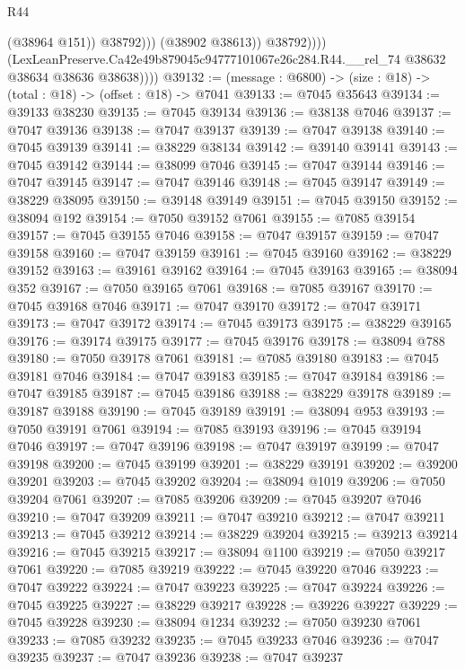 \begin{lexlean}{R44}
\begin{coremodule}
{                            (@38964 @151))
                          @38792)))
                    (@38902 @38613))
                  @38792))))
          (LexLeanPreserve.Ca42e49b879045c94777101067e26c284.R44.__rel_74
            @38632
            @38634
            @38636
            @38638))))
@39132 := (message : @6800) -> (size : @18) -> (total : @18) -> (offset : @18) -> @7041
@39133 := @7045 @35643
@39134 := @39133 @38230
@39135 := @7045 @39134
@39136 := @38138 @7046
@39137 := @7047 @39136
@39138 := @7047 @39137
@39139 := @7047 @39138
@39140 := @7045 @39139
@39141 := @38229 @38134
@39142 := @39140 @39141
@39143 := @7045 @39142
@39144 := @38099 @7046
@39145 := @7047 @39144
@39146 := @7047 @39145
@39147 := @7047 @39146
@39148 := @7045 @39147
@39149 := @38229 @38095
@39150 := @39148 @39149
@39151 := @7045 @39150
@39152 := @38094 @192
@39154 := @7050 @39152 @7061
@39155 := @7085 @39154
@39157 := @7045 @39155 @7046
@39158 := @7047 @39157
@39159 := @7047 @39158
@39160 := @7047 @39159
@39161 := @7045 @39160
@39162 := @38229 @39152
@39163 := @39161 @39162
@39164 := @7045 @39163
@39165 := @38094 @352
@39167 := @7050 @39165 @7061
@39168 := @7085 @39167
@39170 := @7045 @39168 @7046
@39171 := @7047 @39170
@39172 := @7047 @39171
@39173 := @7047 @39172
@39174 := @7045 @39173
@39175 := @38229 @39165
@39176 := @39174 @39175
@39177 := @7045 @39176
@39178 := @38094 @788
@39180 := @7050 @39178 @7061
@39181 := @7085 @39180
@39183 := @7045 @39181 @7046
@39184 := @7047 @39183
@39185 := @7047 @39184
@39186 := @7047 @39185
@39187 := @7045 @39186
@39188 := @38229 @39178
@39189 := @39187 @39188
@39190 := @7045 @39189
@39191 := @38094 @953
@39193 := @7050 @39191 @7061
@39194 := @7085 @39193
@39196 := @7045 @39194 @7046
@39197 := @7047 @39196
@39198 := @7047 @39197
@39199 := @7047 @39198
@39200 := @7045 @39199
@39201 := @38229 @39191
@39202 := @39200 @39201
@39203 := @7045 @39202
@39204 := @38094 @1019
@39206 := @7050 @39204 @7061
@39207 := @7085 @39206
@39209 := @7045 @39207 @7046
@39210 := @7047 @39209
@39211 := @7047 @39210
@39212 := @7047 @39211
@39213 := @7045 @39212
@39214 := @38229 @39204
@39215 := @39213 @39214
@39216 := @7045 @39215
@39217 := @38094 @1100
@39219 := @7050 @39217 @7061
@39220 := @7085 @39219
@39222 := @7045 @39220 @7046
@39223 := @7047 @39222
@39224 := @7047 @39223
@39225 := @7047 @39224
@39226 := @7045 @39225
@39227 := @38229 @39217
@39228 := @39226 @39227
@39229 := @7045 @39228
@39230 := @38094 @1234
@39232 := @7050 @39230 @7061
@39233 := @7085 @39232
@39235 := @7045 @39233 @7046
@39236 := @7047 @39235
@39237 := @7047 @39236
@39238 := @7047 @39237
}
\end{coremodule}
\end{lexlean}
